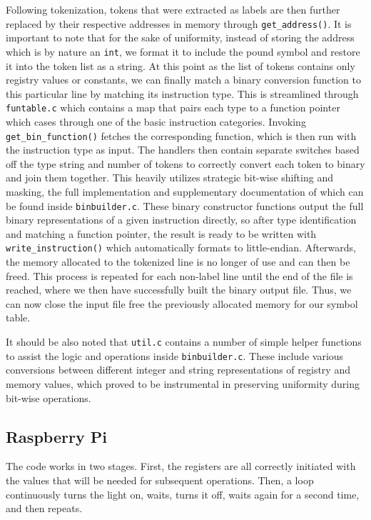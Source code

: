 \documentclass[11pt]{article}
\begin{document}
Following tokenization, tokens that were extracted as labels are then further replaced
by their respective addresses in memory through \verb|get_address()|. It is important to
note that for the sake of uniformity, instead of storing the address which is by nature an
\verb|int|, we format it to include the pound symbol and restore it into the token list as
a string. At this point as the list of tokens contains only registry values or constants, we
can finally match a binary conversion function to this particular line by matching its 
instruction type. This is streamlined through \verb|funtable.c| which contains a map that 
pairs each type to a function pointer which cases through one of the basic instruction 
categories. Invoking \verb|get_bin_function()| fetches the corresponding function, which
is then run with the instruction type as input. The handlers then contain separate switches 
based off the type string and number of tokens to correctly convert each token to binary and
join them together. This heavily utilizes strategic bit-wise shifting and masking, the full
implementation and supplementary documentation of which can be found inside 
\verb|binbuilder.c|. These binary constructor functions output the full binary
representations of a given instruction directly, so after type identification and matching
a function pointer, the result is ready to be written with \verb|write_instruction()| which 
automatically formats to little-endian. Afterwards, the memory allocated to the tokenized line 
is no longer of use and can then be freed. This process is repeated for each non-label line 
until the end of the file is reached, where we then have successfully built the binary output 
file. Thus, we can now close the input file free the previously allocated memory for our 
symbol table.

It should be also noted that \verb|util.c| contains a number of simple helper functions to
assist the logic and operations inside \verb|binbuilder.c|. These include various conversions 
between different integer and string representations of registry and memory values, which 
proved to be instrumental in preserving uniformity during bit-wise operations.

\subsection{Raspberry Pi}

The code works in two stages. First, the registers are all correctly initiated with the values 
that will be needed for subsequent operations. Then, a loop continuously turns the light on, 
waits, turns it off, waits again for a second time, and then repeats.
\end{document}
